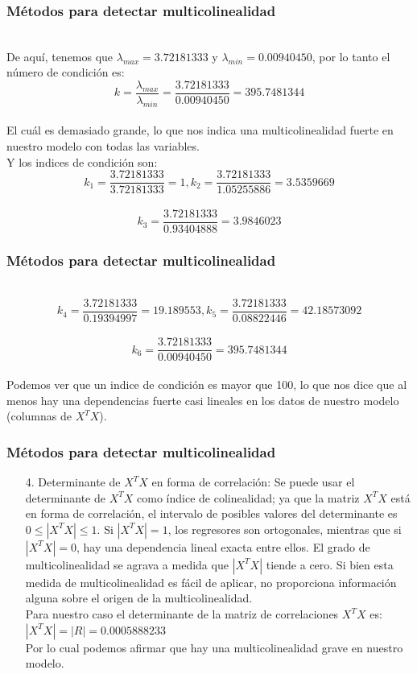\documentclass[12pt]{beamer}
\begin{document}
\begin{frame}
\frametitle{Métodos para detectar multicolinealidad}
~\\De aquí, tenemos que $\lambda_{max}=3.72181333$ y $\lambda_{min}=0.00940450$, por lo tanto el número de condición es:
$$k=\frac{\lambda_{max}}{\lambda_{min}}=\frac{3.72181333}{0.00940450}=395.7481344$$
~\\El cuál es demasiado grande, lo que nos indica una multicolinealidad fuerte en nuestro modelo con todas las variables.
~\\Y los indices de condición son:
~\\$$k_{1}=\frac{3.72181333}{3.72181333}=1,k_{2}=\frac{3.72181333}{1.05255886}=3.5359669$$
~\\$$k_{3}=\frac{3.72181333}{0.93404888}=3.9846023$$
\end{frame}

\begin{frame}
\frametitle{Métodos para detectar multicolinealidad}
~\\$$k_{4}=\frac{3.72181333}{0.19394997}=19.189553,k_{5}=\frac{3.72181333}{0.08822446}=42.18573092$$
~\\$$k_{6}=\frac{3.72181333}{0.00940450}=395.7481344$$
~\\Podemos ver que un indice de condición es mayor que 100, lo que nos dice que al menos hay una dependencias fuerte casi lineales en los datos de nuestro modelo (columnas de $X^{T}X$).
\end{frame}

\begin{frame}
\frametitle{Métodos para detectar multicolinealidad}
\begin{itemize}
\item[4.]Determinante de $X^{T}X$ en forma de correlación: Se puede usar el determinante de $X^{T}X$ como índice de colinealidad; ya que la matriz $X^{T}X$ está en forma de correlación, el intervalo de posibles valores del determinante es $0\leq |X^{T}X| \leq 1$. Si $|X^{T}X| = 1$, los regresores son ortogonales, mientras que si $|X^{T}X|=0$, hay una dependencia lineal exacta entre ellos. El grado de multicolinealidad se agrava a medida que $|X^{T}X|$ tiende a cero. Si bien esta medida de multicolinealidad es fácil de aplicar, no proporciona información alguna sobre el origen de la multicolinealidad.
~\\Para nuestro caso el determinante de la matriz de correlaciones $X^{T}X$ es:$|X^{T}X|=|R|=0.0005888233$
~\\Por lo cual podemos afirmar que hay una multicolinealidad grave en nuestro modelo.
\end{itemize}
\end{frame}
\end{document}
